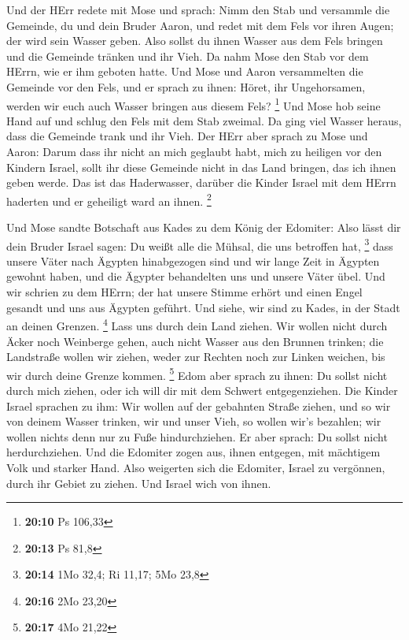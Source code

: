  Und der HErr redete mit Mose und sprach: 
Nimm den Stab und versammle die Gemeinde, du und dein Bruder Aaron, und
redet mit dem Fels vor ihren Augen; der wird sein Wasser geben. Also
sollst du ihnen Wasser aus dem Fels bringen und die Gemeinde tränken und
ihr Vieh.  Da nahm Mose den Stab vor dem HErrn, wie er ihm
geboten hatte.  Und Mose und Aaron versammelten die
Gemeinde vor den Fels, und er sprach zu ihnen: Höret, ihr Ungehorsamen,
werden wir euch auch Wasser bringen aus diesem Fels? \footnote{\textbf{20:10}
  Ps 106,33}  Und Mose hob seine Hand auf und schlug den
Fels mit dem Stab zweimal. Da ging viel Wasser heraus, dass die Gemeinde
trank und ihr Vieh.  Der HErr aber sprach zu Mose und
Aaron: Darum dass ihr nicht an mich geglaubt habt, mich zu heiligen vor
den Kindern Israel, sollt ihr diese Gemeinde nicht in das Land bringen,
das ich ihnen geben werde.  Das ist das Haderwasser,
darüber die Kinder Israel mit dem HErrn haderten und er geheiligt ward
an ihnen. \footnote{\textbf{20:13} Ps 81,8}

 Und Mose sandte Botschaft aus Kades zu dem König der
Edomiter: Also lässt dir dein Bruder Israel sagen: Du weißt alle die
Mühsal, die uns betroffen hat, \footnote{\textbf{20:14} 1Mo 32,4; Ri
  11,17; 5Mo 23,8}  dass unsere Väter nach Ägypten
hinabgezogen sind und wir lange Zeit in Ägypten gewohnt haben, und die
Ägypter behandelten uns und unsere Väter übel.  Und wir
schrien zu dem HErrn; der hat unsere Stimme erhört und einen Engel
gesandt und uns aus Ägypten geführt. Und siehe, wir sind zu Kades, in
der Stadt an deinen Grenzen. \footnote{\textbf{20:16} 2Mo 23,20}
 Lass uns durch dein Land ziehen. Wir wollen nicht durch
Äcker noch Weinberge gehen, auch nicht Wasser aus den Brunnen trinken;
die Landstraße wollen wir ziehen, weder zur Rechten noch zur Linken
weichen, bis wir durch deine Grenze kommen. \footnote{\textbf{20:17} 4Mo
  21,22}  Edom aber sprach zu ihnen: Du sollst nicht
durch mich ziehen, oder ich will dir mit dem Schwert entgegenziehen.
 Die Kinder Israel sprachen zu ihm: Wir wollen auf der
gebahnten Straße ziehen, und so wir von deinem Wasser trinken, wir und
unser Vieh, so wollen wir's bezahlen; wir wollen nichts denn nur zu Fuße
hindurchziehen.  Er aber sprach: Du sollst nicht
herdurchziehen. Und die Edomiter zogen aus, ihnen entgegen, mit
mächtigem Volk und starker Hand.  Also weigerten sich die
Edomiter, Israel zu vergönnen, durch ihr Gebiet zu ziehen. Und Israel
wich von ihnen.

